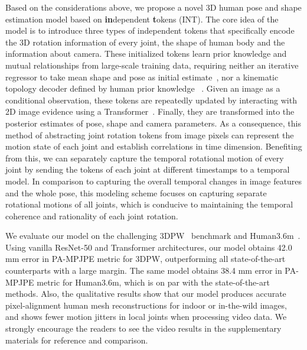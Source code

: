 Based on the considerations above, we propose a novel 3D human pose and shape estimation model based on \textbf{in}dependent \textbf{t}okens (INT). 
The core idea of the model is to introduce three types of independent tokens that specifically encode the 3D rotation information of every joint, the shape of human body and the information about camera. 
These initialized tokens learn prior knowledge and mutual relationships from large-scale training data, requiring neither an iterative regressor to take mean shape and pose as initial estimate~\citep{hmr:kanazawa2018end, spin:kolotouros2019learning, vibe:kocabas2020vibe, tcmr:choi2021beyond}, nor a kinematic topology decoder defined by human prior knowledge~\citep{maed:wan2021encoder} . 
Given an image as a conditional observation, these tokens are repeatedly updated by interacting with 2D image evidence using a Transformer~\citep{transformer:vaswani2017attention}. 
Finally, they are transformed into the posterior estimates of pose, shape and camera parameters. 
As a consequence, this method of abstracting joint rotation tokens from image pixels can represent the motion state of each joint and establish correlations in time dimension.
 Benefiting from this, we can separately capture the temporal rotational motion of every joint by sending the tokens of each joint at different timestamps to a temporal model.
In comparison to capturing the overall temporal changes in image features and the whole pose, this modeling scheme focuses on capturing separate rotational motions of all joints, which is conducive to maintaining the temporal coherence and rationality of each joint rotation.

We evaluate our model on the challenging 3DPW~\citep{3dpw:von2018recovering} benchmark and Human3.6m~\citep{h36m:ionescu2013human3}. 
Using vanilla ResNet-50 and Transformer architectures, our model obtains 42.0 mm error in PA-MPJPE metric for 3DPW, outperforming all state-of-the-art counterparts with a large margin. The same model obtains 38.4 mm error in PA-MPJPE metric for Human3.6m, which is on par with the state-of-the-art methods. 
Also, the qualitative results show that our model produces accurate pixel-alignment human mesh reconstructions for indoor or in-the-wild images, and shows fewer motion jitters in local joints when processing video data. 
We strongly encourage the readers to see the video results in the supplementary materials for reference and comparison.



